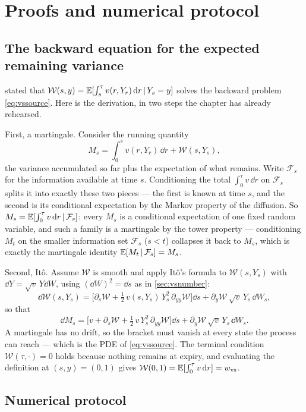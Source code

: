\section{Proofs and numerical protocol}
\label{app:vsprotocol}

\subsection{The backward equation for the expected remaining variance}

 stated that
$\mathcal{W}(s,y)=\mathbb{E}[\int_s^{\tau}v(r,Y_r)\,\mathrm{d} r\,|\,Y_s=y]$
solves the backward problem \eqref{eq:vssource}.  Here is the
derivation, in two steps the chapter has already rehearsed.

First, a martingale.  Consider the running quantity
\[
M_s=\int_0^{s}v(r,Y_r)\,\dd r+\mathcal{W}(s,Y_s),
\]
the variance accumulated so far plus the expectation of what remains.
Write $\mathcal{F}_s$ for the information available at time $s$.
Conditioning the total $\int_0^{\tau}v\,\dd r$ on $\mathcal{F}_s$
splits it into exactly these two pieces --- the first is known at
time $s$, and the second is its conditional expectation by the Markov
property of the diffusion.  So
$M_s=\mathbb{E}[\int_0^{\tau}v\,\mathrm{d} r\,|\,\mathcal{F}_s]$: every $M_s$ is a
conditional expectation of one fixed random variable, and such a
family is a martingale by the tower property --- conditioning $M_t$
on the smaller information set $\mathcal{F}_s$ ($s<t$) collapses it
back to $M_s$, which is exactly the martingale identity
$\mathbb{E}[M_t\,|\,\mathcal{F}_s]=M_s$.

Second, It\^o.  Assume $\mathcal{W}$ is smooth and apply It\^o's
formula to $\mathcal{W}(s,Y_s)$ with $\dd Y=\sqrt{v}\,Y\dd W$, using
$(\dd W)^2=\dd s$ as in \cref{sec:vsnumber}:
\[
\dd\mathcal{W}(s,Y_s)
=\Big[\partial_s\mathcal{W}
+\tfrac12\,v(s,Y_s)\,Y_s^{2}\,\partial_{yy}\mathcal{W}\Big]\dd s
+\partial_y\mathcal{W}\,\sqrt{v}\,Y_s\,\dd W_s ,
\]
so that
\[
\dd M_s
=\Big[v+\partial_s\mathcal{W}
+\tfrac12\,v\,Y_s^{2}\,\partial_{yy}\mathcal{W}\Big]\dd s
+\partial_y\mathcal{W}\,\sqrt{v}\,Y_s\,\dd W_s .
\]
A martingale has no drift, so the bracket must vanish at every state
the process can reach --- which is the PDE of \eqref{eq:vssource}.
The terminal condition $\mathcal{W}(\tau,\cdot)=0$ holds because
nothing remains at expiry, and evaluating the definition at
$(s,y)=(0,1)$ gives
$\mathcal{W}(0,1)=\mathbb{E}[\int_0^{\tau}v\,\mathrm{d} r]=w_{\rm vs}$.

\subsection{Numerical protocol}

